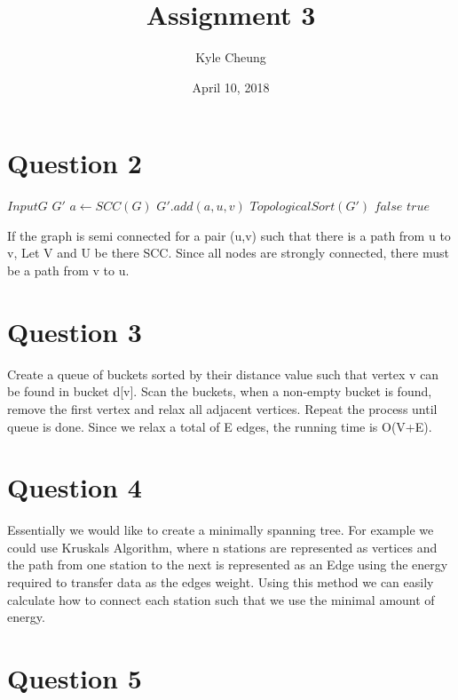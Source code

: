 \documentclass[10pt]{article}
\title{Assignment 3}
\date{April 10, 2018}
\author{Kyle Cheung}
\begin{document}
\maketitle
{}
\newpage
{}

\section*{Question 2}

\begin{algorithmic}
\State $Input G$
\State $G'$
\State $a\gets SCC(G)$
\State $G'.add(a,{u,v})$
\EndWhile
\State $Topological Sort(G')$
\State $false$
\EndIf
\EndFor
\State $true$
\end{algorithmic}

If the graph is semi connected for a pair (u,v) such that there is a path from u to v, Let V and U be there SCC. Since all nodes are strongly connected, there must be a path from v to u.

\section*{Question 3}

Create a queue of buckets sorted by their distance value such that vertex v can be found in bucket d[v]. Scan the buckets, when a non-empty bucket is found, remove the first vertex and relax all adjacent vertices. Repeat the process until queue is done. Since we relax a total of E edges, the running time is O(V+E).

\section*{Question 4}

Essentially we would like to create a minimally spanning tree. For example we could use Kruskals Algorithm, where n stations are represented as vertices and the path from one station to the next is represented as an Edge using the energy required to transfer data as the edges weight. Using this method we can easily calculate how to connect each station such that we use the minimal amount of energy.

\section*{Question 5}
\end{document}

